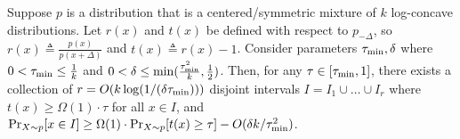 \begin{lemma}\label{lemma:intervals}
    Suppose $p$ is a distribution that is a centered/symmetric mixture of $k$ log-concave distributions. Let $r(x)$ and $t(x)$ be defined with respect to $p_{-\Delta}$, so $r(x) \triangleq \frac{p(x)}{p(x+\Delta)}$ and $t(x) \triangleq r(x)-1$.
     Consider parameters $\tau_{\textrm{min}},\delta$ where $0 < \tau_{\textrm{min}} \le \frac{1}{k}$ and $0<\delta \le \min(\frac{\tau_{\textrm{min}}^2}{k},\frac{1}{2})$. 
    Then, for any $\tau \in [\tau_{\textrm{min}},1]$, there exists a collection of $r =O(k \log(1/(\delta \tau_{\textrm{min}})))$ disjoint intervals $I = I_1 \cup \dots \cup I_r$ where $t(x) \ge \Omega(1) \cdot \tau$ for all $x \in I$, and $\operatorname{{Pr}}_{X \sim p}[x \in I] \ge \Omega(1) \cdot \operatorname{{Pr}}_{X \sim p}[t(x) \ge \tau] - O(\delta k/\tau_{\textrm{min}}^2)$.

\end{lemma}

